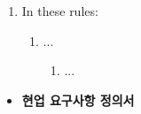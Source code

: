 \begin{enumerate}
    \item In these rules:
    \begin{enumerate}
        \item ...
        \begin{enumerate}
            \item ...
        \end{enumerate}
    \end{enumerate}    
\end{enumerate}

\begin{landscape}

    \begin{itemize}
        \item[] \textbf{현업 요구사항 정의서}
    \end{itemize}


\end{landscape}
